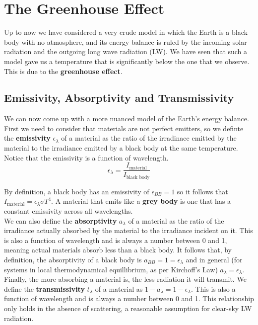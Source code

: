 \section{The Greenhouse Effect}
\label{greenhouse_effect}

Up to now we have considered a very crude model in which the Earth is a black body with no atmosphere, and its energy 
balance is ruled by the incoming solar radiation and the outgoing long wave radiation (\gls{LW}). We have seen
that such a model gave us a temperature that is significantly below the one that we observe. This is due to the 
\textbf{greenhouse effect}.

\subsection{Emissivity, Absorptivity and Transmissivity}
We can now come up with a more nuanced model of the Earth's energy balance. First we need to consider that materials are
not perfect emitters, so we definte the \textbf{\gls{emissivity}} $\epsilon_\lambda$ of 
a material as the ratio of the irradinace emitted by the material to the irradiance emitted by a black body at the same
temperature. Notice that the \gls{emissivity} is a function of wavelength. 
$$
\epsilon_\lambda = \frac{I_{\text{material}}}{I_{\text{black body}}}
$$

By definition, a black body has an \gls{emissivity} of $\epsilon_{BB} = 1$ so it follows that 
$I_{\text{material}} = \epsilon_\lambda \sigma T^4$. A material that emits like a \textbf{grey body} is one that has a 
constant \gls{emissivity} across all wavelengths. \\

\noindent We can also define the \textbf{\gls{absorptivity}} $a_\lambda$ of a
material as the ratio of the irradiance actually absorbed by the material to the irradiance incident on it. This is also
a function of wavelength and is always a number between 0 and 1, meaning actual materials absorb less than a black body.
It follows that, by definition, the \gls{absorptivity} of a black body is 
$a_{BB} = 1 = \epsilon_\lambda$ and in general (for systems in local thermodynamical equillibrium, as per Kirchoff's Law)
$a_\lambda = \epsilon_\lambda$.\\

\noindent Finally, the more absorbing a material is, the less radiation it will transmit. We define the 
\textbf{\gls{transmissivity}} $t_\lambda$ of a material as $1 - a_\lambda = 1 - \epsilon_\lambda$.
 This is also a function of wavelength and is always a number between 0 and 1. This relationship only
holds in the absence of scattering, a reasonable assumption for clear-sky \gls{LW} radiation.

